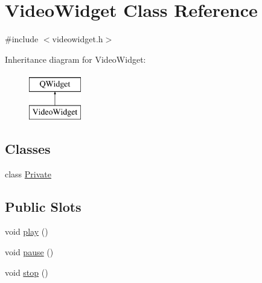 \hypertarget{classVideoWidget}{\section{Video\+Widget Class Reference}
\label{classVideoWidget}
}


{\ttfamily \#include $<$videowidget.\+h$>$}

Inheritance diagram for Video\+Widget\+:\begin{figure}[H]
\begin{center}
\leavevmode
\includegraphics[height=2.000000cm]{classVideoWidget}
\end{center}
\end{figure}
\subsection*{Classes}
\begin{DoxyCompactItemize}
\item 
class \hyperlink{classVideoWidget_1_1Private}{Private}
\end{DoxyCompactItemize}
\subsection*{Public Slots}
\begin{DoxyCompactItemize}
\item 
void \hyperlink{classVideoWidget_a00e08beaa6d8234f0cd3a6ef51e6709c}{play} ()
\item 
void \hyperlink{classVideoWidget_a25170452e03c644be15ff4ab4ee0b533}{pause} ()
\item 
void \hyperlink{classVideoWidget_a71bd6da5120ab3556d0ac41e905f6e26}{stop} ()
\end{DoxyCompactItemize}
